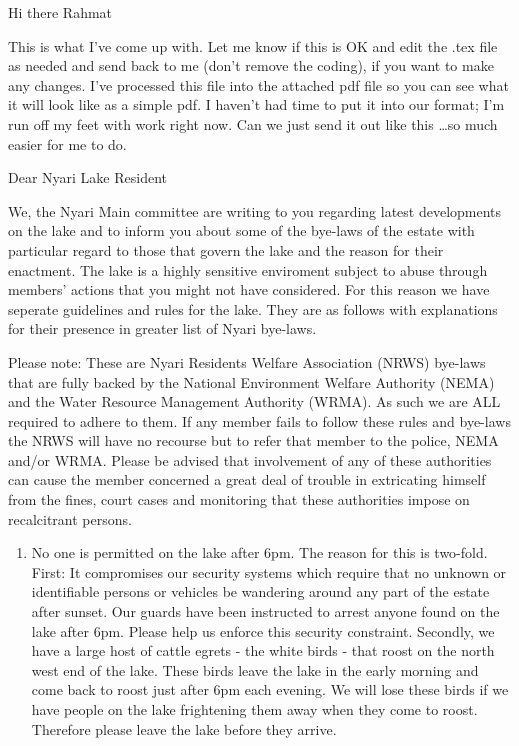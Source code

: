 \documentclass[a4paper,10pt, oneside]{letter}
\begin{document}
\begin{letter} {}
\opening{Hi there Rahmat}

This is what I've come up with. Let me know if this is OK and edit the .tex file as needed and send back to me (don't remove the coding), if you want to make any changes. I've processed this file into the attached pdf file so you can see what it will look like as a simple pdf. I haven't had time to put it into our format; I'm run off my feet with work right now. Can we just send it out like this \ldots so much easier for me to do.\\

\newline
\hline

Dear Nyari Lake Resident

We, the Nyari Main committee are writing to you regarding latest developments on the lake and to inform you about some of the bye-laws of the estate with particular regard to those that govern the lake and the reason for their enactment. The lake is a highly sensitive enviroment subject to abuse through members' actions that you might not have considered. For this reason we have seperate guidelines and rules for the lake. They are as follows with explanations for their presence in greater list of Nyari bye-laws.

Please note: These are Nyari Residents Welfare Association (NRWS) bye-laws that are fully backed by the National Environment Welfare Authority (NEMA) and the Water Resource Management Authority (WRMA). As such we are ALL required to adhere to them. If any member fails to follow these rules and bye-laws the NRWS will have no recourse but to refer that member to the police, NEMA and/or WRMA. Please be advised that involvement of any of these authorities can cause the member concerned a great deal of trouble in extricating himself from the fines, court cases and monitoring that these authorities impose on recalcitrant persons.

\begin{enumerate}
\item No one is permitted on the lake after 6pm. The reason for this is two-fold. First: It compromises our security systems which require that no unknown or identifiable persons or vehicles be wandering around any part of the estate after sunset. Our guards have been instructed to arrest anyone found on the lake after 6pm. Please help us enforce this security constraint. Secondly, we have a large host of cattle egrets - the white birds - that roost on the north west end of the lake. These birds leave the lake in the early morning and come back to roost just after 6pm each evening. We will lose these birds if we have people on the lake frightening them away when they come to roost. Therefore please leave the lake before they arrive.


\end{enumerate}
\end{letter}
\end{document}
